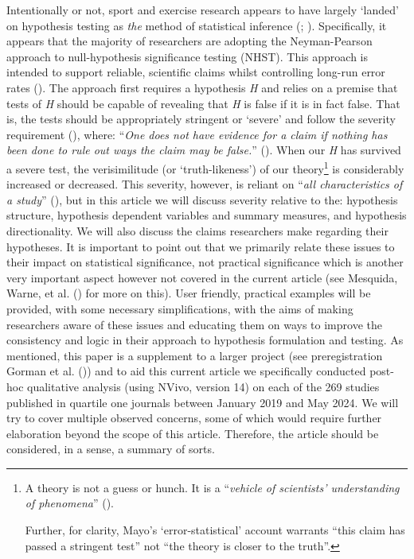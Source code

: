 \documentclass[
]{article}
\begin{document}
Intentionally or not, sport and exercise research appears to have
largely `landed' on hypothesis testing as \emph{the} method of
statistical inference (; ).
Specifically, it appears that the majority of researchers are adopting
the Neyman-Pearson approach to null-hypothesis significance testing
(NHST). This approach is intended to support reliable, scientific claims
whilst controlling long-run error rates
(). The approach first
requires a hypothesis \emph{H} and relies on a premise that tests of
\emph{H} should be capable of revealing that \emph{H} is false if it is
in fact false. That is, the tests should be appropriately stringent or
`severe' and follow the severity requirement
(), where: ``\emph{One
does not have evidence for a claim if nothing has been done to rule out
ways the claim may be false.}''
(). When our
\emph{H} has survived a severe test, the verisimilitude (or
`truth-likeness') of our theory\footnote{A theory is not a guess or
  hunch. It is a ``\emph{vehicle of scientists' understanding of
  phenomena}'' ().

  Further, for clarity, Mayo's `error-statistical' account warrants
  ``this claim has passed a stringent test'' not ``the theory is closer
  to the truth''.} is considerably increased or decreased. This
severity, however, is reliant on ``\emph{all characteristics of a
study}'' (), but in this
article we will discuss severity relative to the: hypothesis structure,
hypothesis dependent variables and summary measures, and hypothesis
directionality. We will also discuss the claims researchers make
regarding their hypotheses. It is important to point out that we
primarily relate these issues to their impact on statistical
significance, not practical significance which is another very important
aspect however not covered in the current article (see Mesquida, Warne,
et al. () for more on this). User
friendly, practical examples will be provided, with some necessary
simplifications, with the aims of making researchers aware of these
issues and educating them on ways to improve the consistency and logic
in their approach to hypothesis formulation and testing. As mentioned,
this paper is a supplement to a larger project (see preregistration
Gorman et al. ()) and to aid this current
article we specifically conducted post-hoc qualitative analysis (using
NVivo, version 14) on each of the 269 studies published in quartile one
journals between January 2019 and May 2024. We will try to cover
multiple observed concerns, some of which would require further
elaboration beyond the scope of this article. Therefore, the article
should be considered, in a sense, a summary of sorts.
\end{document}
